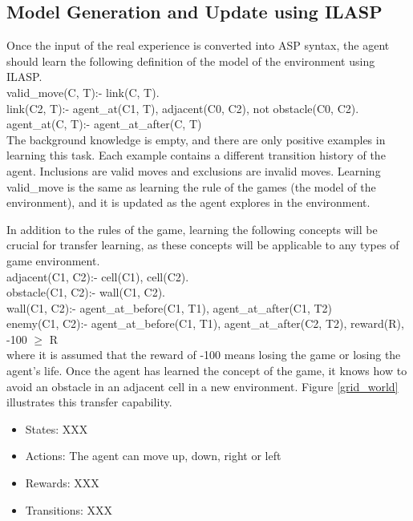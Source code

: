 \subsection{Model Generation and Update using ILASP}
\label{model_generation_and_update}
Once the input of the real experience is converted into ASP syntax, the agent should learn the following definition of the model of the environment using ILASP. \\

valid\_move(C, T):- link(C, T).
\\
link(C2, T):- agent\_at(C1, T), adjacent(C0, C2), not obstacle(C0, C2).\\
agent\_at(C, T):- agent\_at\_after(C, T) \\

The background knowledge is empty, and there are only positive examples in learning this task. Each example contains a different transition history of the agent. 
Inclusions are valid moves and exclusions are invalid moves. 
Learning valid\_move is the same as learning the rule of the games (the model of the environment), and it is updated as the agent explores in the environment.

In addition to the rules of the game, learning the following concepts will be crucial for transfer learning, as these concepts will be applicable to any types of game environment.  \\

adjacent(C1, C2):- cell(C1), cell(C2). \\
obstacle(C1, C2):- wall(C1, C2). \\
wall(C1, C2):- agent\_at\_before(C1, T1), agent\_at\_after(C1, T2) \\
enemy(C1, C2):- agent\_at\_before(C1, T1), agent\_at\_after(C2, T2), reward(R), -100 $\geq$ R \\

where it is assumed that the reward of -100 means losing the game or losing the agent's life. 
Once the agent has learned the concept of the game, it knows how to avoid an obstacle in an adjacent cell in a new environment. 
Figure \ref{grid_world} illustrates this transfer capability.

\begin{itemize}

\item States: XXX
\item Actions: The agent can move up, down, right or left
\item Rewards: XXX
\item Transitions: XXX

\end{itemize}
